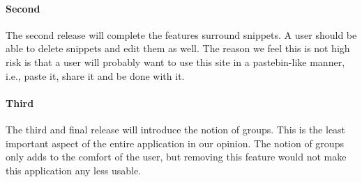 \documentclass[10pt,a4paper,BCOR12mm, headexclude, footexclude,
  twoside, openright]{scrartcl}
\numberwithin{equation}{section} %
\numberwithin{figure}{section} %
\numberwithin{table}{section} %
\begin{document}
\paragraph{Second} The second release will complete the features surround
snippets. A user should be able to delete snippets and edit them as well. The
reason we feel this is not high risk is that a user will probably want to use
this site in a pastebin-like manner, i.e., paste it, share it and be done with
it.

\paragraph{Third} The third and final release will introduce the notion of
groups. This is the least important aspect of the entire application in our
opinion. The notion of groups only adds to the comfort of the user, but removing this feature would not make this application any less usable.





\end{document}
